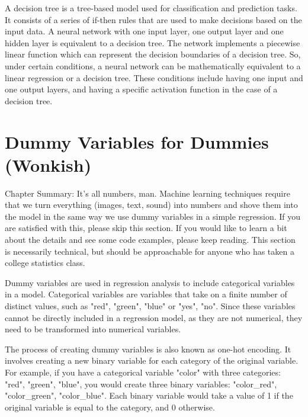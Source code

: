 A decision tree is a tree-based model used for classification and prediction tasks. It consists of a series of if-then rules that are used to make decisions based on the input data. A neural network with one input layer, one output layer and one hidden layer is equivalent to a decision tree. The network implements a piecewise linear function which can represent the decision boundaries of a decision tree. So, under certain conditions, a neural network can be mathematically equivalent to a linear regression or a decision tree. These conditions include having one input and one output layers, and having a specific activation function in the case of a decision tree.

\section{Dummy Variables for Dummies (Wonkish)} 

Chapter Summary: It's all numbers, man. Machine learning techniques require that we turn everything (images, text, sound) into numbers and shove them into the model in the same way we use dummy variables in a simple regression. If you are satisfied with this, please skip this section. If you would like to learn a bit about the details and see some code examples, please keep reading. This section is necessarily technical, but should be approachable for anyone who has taken a college statistics class.  



Dummy variables are used in regression analysis to include categorical variables in a model. Categorical variables are variables that take on a finite number of distinct values, such as "red", "green", "blue" or "yes", "no". Since these variables cannot be directly included in a regression model, as they are not numerical, they need to be transformed into numerical variables.

The process of creating dummy variables is also known as one-hot encoding. It involves creating a new binary variable for each category of the original variable. For example, if you have a categorical variable "color" with three categories: "red", "green", "blue", you would create three binary variables: "color\_red", "color\_green", "color\_blue". Each binary variable would take a value of 1 if the original variable is equal to the category, and 0 otherwise.

